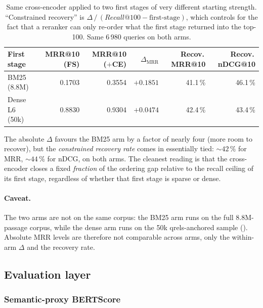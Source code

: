 \documentclass[11pt,a4paper]{article}
\makeatletter
\newcommand{\fdev}{6\,980}
\newcommand{\bertscore}{BERTScore}
\newcommand{\mrr}{MRR@10}
\newcommand{\ndcg}{nDCG@10}
\newcommand{\recallH}{Recall@100}
\newcommand{\bmtwofive}{BM25}
\makeatother
\begin{document}
\begin{table}[H]
  \centering
  \caption{Same cross-encoder applied to two first stages
  of very different starting strength.  ``Constrained recovery'' is
  $\Delta\,/\,(\recallH{} - \text{first-stage})$, which controls for
  the fact that a reranker can only re-order what the first stage
  returned into the top-100.  Same \fdev{} queries on both arms.}
  \label{tab:w5a-results}
  \small
  \setlength{\tabcolsep}{4pt}
  \begin{tabular}{@{}lrrrrr@{}}
    \toprule
    First stage           & \mrr{} (FS) & \mrr{} ($+$CE) & $\Delta_\mathrm{MRR}$ & Recov.\,\mrr{} & Recov.\,\ndcg{} \\
    \midrule
    \bmtwofive{} (8.8M)   & 0.1703      & 0.3554         & $+0.1851$             & 41.1\,\%        & 46.1\,\%        \\
    Dense L6 (50k)        & 0.8830      & 0.9304         & $+0.0474$             & 42.4\,\%        & 43.4\,\%        \\
    \bottomrule
  \end{tabular}
\end{table}

The absolute $\Delta$ favours the \bmtwofive{} arm by a factor of
nearly four (more room to recover), but the \emph{constrained
recovery rate} comes in essentially tied: $\sim\!42\,\%$ for MRR,
$\sim\!44\,\%$ for nDCG, on both arms.  The cleanest reading is
that the cross-encoder closes a fixed \emph{fraction} of the
ordering gap relative to the recall ceiling of its first stage,
regardless of whether that first stage is sparse or dense.

\paragraph{Caveat.}  The two arms are not on the same corpus: the
\bmtwofive{} arm runs on the full 8.8M-passage corpus, while the
dense arm runs on the 50k qrels-anchored sample
().  Absolute MRR levels are therefore
not comparable across arms, only the within-arm $\Delta$ and the
recovery rate.

\subsection{Evaluation layer}
\label{sec:w6}

\subsubsection{Semantic-proxy \bertscore{}}
\label{sec:w6-bertscore}
\end{document}
